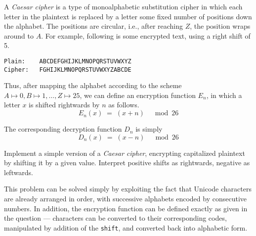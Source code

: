 

\problem A {\em Caesar cipher} is a type of monoalphabetic substitution cipher in which each letter
in the plaintext is replaced by a letter some fixed number of positions down the alphabet. The positions
are circular, i.e., after reaching $Z$, the position wraps around to $A$. For example, following is some encrypted
text, using a right shift of 5.

\begin{lstlisting}[numbers=none, xleftmargin=.25\textwidth, xrightmargin=.2\textwidth]
Plain:    ABCDEFGHIJKLMNOPQRSTUVWXYZ
Cipher:   FGHIJKLMNOPQRSTUVWXYZABCDE
\end{lstlisting}

Thus, after mapping the alphabet according to the scheme $A\mapsto 0, B\mapsto 1,\dots,Z\mapsto 25$, we can define
an encryption function $E_n$, in which a letter $x$ is shifted rightwards by $n$ as follows.
\begin{equation*}
	E_n(x)	\;=\;	(x + n)	\quad\bmod 26
\end{equation*}

The corresponding decryption function $D_n$ is simply
\begin{equation*}
	D_n(x)	\;=\;	(x - n)	\quad\bmod 26
\end{equation*}

Implement a simple version of a {\em Caesar cipher}, encrypting capitalized plaintext by shifting it by a given value.
Interpret positive shifts as rightwards, negative as leftwards.

\solution This problem can be solved simply by exploiting the fact that Unicode characters are already arranged in order, with successive alphabets encoded by consecutive numbers. In addition, the encryption function can be defined exactly as given in the question --- characters can be converted to their corresponding codes, manipulated by addition of the {\tt shift}, and converted back into alphabetic form.

